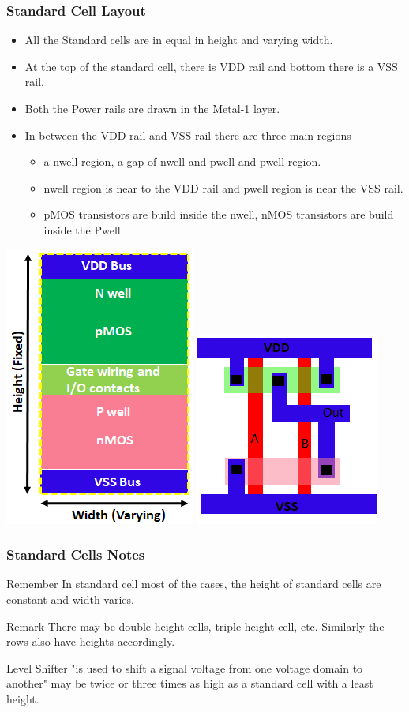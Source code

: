 \documentclass{beamer}
\begin{document}
	\begin{frame}
	\frametitle{Standard Cell Layout}
	\begin{itemize}
		\item All the Standard cells are in equal in height and varying width.
		\item At the top of the standard cell, there is VDD rail and bottom there is a VSS rail.
		\item Both the Power rails are drawn in the Metal-1 layer.
		\item In between the VDD rail and VSS rail there are three main regions
		\begin{itemize}
			\item a nwell region, a gap of nwell and pwell and pwell region.
			\item nwell region is near to the VDD rail and pwell region is near the VSS rail.
			\item pMOS transistors are build inside the nwell, nMOS transistors are build inside the Pwell
		\end{itemize}
	\end{itemize}
		\begin{center}
	\includegraphics[width=0.2 \textwidth]{Standard_cell}\qquad \qquad
	\includegraphics[width=0.2 \textwidth]{nand_layout2}

	\end{center}

\end{frame}
\begin{frame}
	\frametitle{Standard Cells Notes}
	
	
	\begin{block}{Remember}
		In standard cell most of the cases, the height of standard cells are constant and width varies.
	\end{block}
	
	\begin{alertblock}{Remark}
There may be double height cells, triple height cell, etc. Similarly the rows also have heights accordingly.
	\end{alertblock}
	
	\begin{examples}
	Level Shifter "is used to shift a signal voltage from one voltage domain to another" may be twice or three times as high as a standard cell with a least height.
	\end{examples}
\end{frame}
\end{document}
